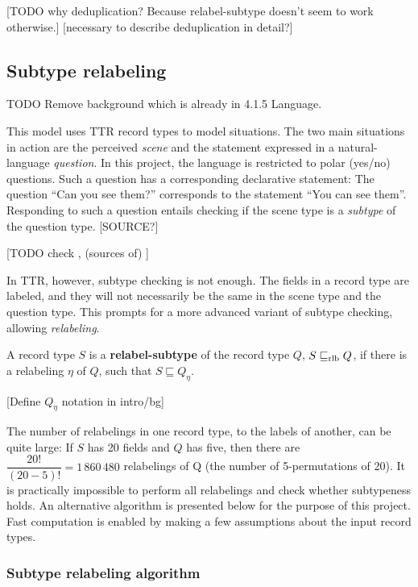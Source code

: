 [TODO why deduplication? Because relabel-subtype doesn't seem to work otherwise.]
[necessary to describe deduplication in detail?]



\subsection{Subtype relabeling}
\label{sec:subtyperelabeling}

TODO Remove background which is already in 4.1.5 Language.

This model uses TTR record types to model situations.
The two main situations in action are the perceived \textit{scene} and the statement expressed in a natural-language \textit{question}.
In this project, the language is restricted to polar (yes/no) questions.
Such a question has a corresponding declarative statement:
The question ``Can you see them?'' corresponds to the statement ``You can see them''.
Responding to such a question entails checking if the scene type is a \textit{subtype} of the question type.
[SOURCE?]

[TODO check \cite{RooyPolarQuestions2003}, (sources of) \cite{AloniQuantificationConceptualCovers2001}]

In TTR, however, subtype checking is not enough.
The fields in a record type are labeled, and they will not necessarily be the same in the scene type and the question type.
This prompts for a more advanced variant of subtype checking, allowing \textit{relabeling}.

\begin{definition}
A record type $S$ is a \textbf{relabel-subtype} of the record type $Q$, $S \mathrel{\sqsubseteq_\text{rlb}} Q$, if there is a relabeling $\eta$ of $Q$, such that $S \sqsubseteq Q_\eta$.
\end{definition}

[Define $Q_\eta$ notation in intro/bg]

The number of relabelings in one record type, to the labels of another, can be quite large:
If $S$ has 20 fields and $Q$ has five, then there are $\dfrac{20!}{(20-5)!} = 1\,860\,480$ relabelings of Q (the number of 5-permutations of 20).
It is practically impossible to perform all relabelings and check whether subtypeness holds.
An alternative algorithm is presented below for the purpose of this project.
Fast computation is enabled by making a few assumptions about the input record types.



\subsubsection{Subtype relabeling algorithm}

